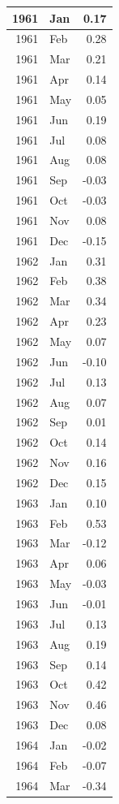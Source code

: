 \documentclass[
]{article}
\begin{document}
\begin{table}[H]
\begin{tabular}[t]{r|l|r}
\hline
1961 & Jan & 0.17\\
\hline
1961 & Feb & 0.28\\
\hline
1961 & Mar & 0.21\\
\hline
1961 & Apr & 0.14\\
\hline
1961 & May & 0.05\\
\hline
1961 & Jun & 0.19\\
\hline
1961 & Jul & 0.08\\
\hline
1961 & Aug & 0.08\\
\hline
1961 & Sep & -0.03\\
\hline
1961 & Oct & -0.03\\
\hline
1961 & Nov & 0.08\\
\hline
1961 & Dec & -0.15\\
\hline
1962 & Jan & 0.31\\
\hline
1962 & Feb & 0.38\\
\hline
1962 & Mar & 0.34\\
\hline
1962 & Apr & 0.23\\
\hline
1962 & May & 0.07\\
\hline
1962 & Jun & -0.10\\
\hline
1962 & Jul & 0.13\\
\hline
1962 & Aug & 0.07\\
\hline
1962 & Sep & 0.01\\
\hline
1962 & Oct & 0.14\\
\hline
1962 & Nov & 0.16\\
\hline
1962 & Dec & 0.15\\
\hline
1963 & Jan & 0.10\\
\hline
1963 & Feb & 0.53\\
\hline
1963 & Mar & -0.12\\
\hline
1963 & Apr & 0.06\\
\hline
1963 & May & -0.03\\
\hline
1963 & Jun & -0.01\\
\hline
1963 & Jul & 0.13\\
\hline
1963 & Aug & 0.19\\
\hline
1963 & Sep & 0.14\\
\hline
1963 & Oct & 0.42\\
\hline
1963 & Nov & 0.46\\
\hline
1963 & Dec & 0.08\\
\hline
1964 & Jan & -0.02\\
\hline
1964 & Feb & -0.07\\
\hline
1964 & Mar & -0.34\\

\end{tabular}
\end{table}
\end{document}
